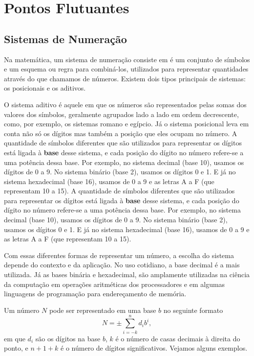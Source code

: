 \chapter{Pontos Flutuantes}
\label{chap:floatingpoints}

\section{Sistemas de Numeração}
Na matemática, um sistema de numeração consiste em é um conjunto de símbolos e
um esquema ou regra para combiná-los, utilizados para representar quantidades
através do que chamamos de números. Existem dois tipos principais de sistemas:
os posicionais e os aditivos.

O sistema aditivo é aquele em que os números são representados pelas somas dos
valores dos símbolos, geralmente agrupados lado a lado em ordem decrescente,
como, por exemplo, os sistemas romano e egípcio. Já o sistema posicional leva
em conta não só os dígitos mas também a posição que eles ocupam no número. A
quantidade de símbolos diferentes que são utilizados para representar os
dígitos está ligada à \textbf{base} desse sistema, e cada posição do dígito no
número refere-se a uma potência dessa base. Por exemplo, no sistema decimal
(base 10), usamos os dígitos de 0 a 9. No sistema binário (base 2), usamos os
dígitos 0 e 1. E já no sistema hexadecimal (base 16), usamos de 0 a 9 e as
letras A a F (que representam 10 a 15). A quantidade de símbolos diferentes que
são utilizados para representar os dígitos está ligada à \textbf{base} desse
sistema, e cada posição do dígito no número refere-se a uma potência dessa
base. Por exemplo, no sistema decimal (base 10), usamos os dígitos de 0 a 9. No
sistema binário (base 2), usamos os dígitos 0 e 1. E já no sistema hexadecimal
(base 16), usamos de 0 a 9 e as letras A a F (que representam 10 a 15).

Com essas diferentes formas de representar um número, a escolha do sistema
depende do contexto e da aplicação. No uso cotidiano, a base decimal é a mais
utilizada. Já as bases binária e hexadecimal, são amplamente utilizadas na
ciência da computação em operações aritméticas dos processadores e em algumas
linguagens de programação para endereçamento de memória.

Um número $N$ pode ser representado em uma base \(b\) no seguinte formato
\begin{equation}
  N = \pm \sum_{i=-k}^{n} d_i b^i,
\end{equation}
em que \(d_i\) são os dígitos na base \(b\), \(k\) é o número de casas decimais à direita do ponto, e \(n+1+k\) é o número de dígitos significativos. Vejamos alguns exemplos.


